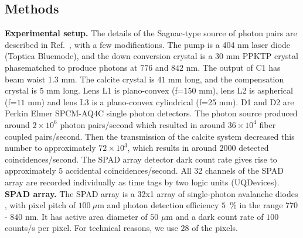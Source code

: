 \documentclass[prl,reprint,twocolumn,amsmath,preprintnumbers,amssymb,superscriptaddress]{revtex4-1}
\begin{document}
\subsection{Methods}
{\bf Experimental setup.} The details of the Sagnac-type source of photon pairs are described in Ref.~\cite{Hamel2010}, with a few modifications.  The pump is a 404 nm laser diode (Toptica Bluemode), and the down conversion crystal is a 30 mm PPKTP crystal phasematched to produce photons at $776$ and $842$ nm. The output of C1 has beam waist 1.3 mm. The calcite crystal is $41$ mm long, and the compensation crystal is $5$ mm long. Lens L1 is plano-convex (f=$150$ mm), lens L2 is aspherical (f=$11$ mm) and lens L3 is a plano-convex cylindrical  (f=25 mm). D1 and D2 are Perkin Elmer SPCM-AQ4C single photon detectors. The photon source produced around $2\times 10^6$ photon pairs/second which resulted in around $36\times 10^4$ fiber coupled pairs/second. Then the transmission of the calcite system decreased this number to approximately $72\times 10^3$, which results in around $2000$ detected coincidences/second. The SPAD array detector dark count rate gives rise to approximately $5$ accidental coincidences/second. All 32 channels of the SPAD array are recorded individually as time tags by two logic units (UQDevices).\
\\
{\bf SPAD array.} The SPAD array is a 32x1 array of single-photon avalanche diodes \cite{Guerrieri2010a,Tisa2007}, with pixel pitch of $100~\mu$m and photon detection efficiency $5$~\% in the range $770$ - $840$ nm. It has active area diameter of $50$ $\mu$m and a dark count rate of $100$ counts/s per pixel. For technical reasons, we use $28$ of the pixels.\\


%
%
\end{document}
